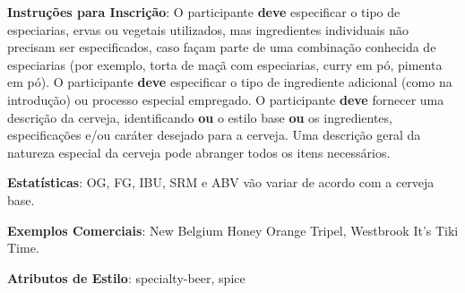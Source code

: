 \textbf{Instruções para Inscrição}: O participante \textbf{deve} especificar o tipo de especiarias, ervas ou vegetais utilizados, mas ingredientes individuais não precisam ser especificados, caso façam parte de uma combinação conhecida de especiarias (por exemplo, torta de maçã com especiarias, curry em pó, pimenta em pó). O participante \textbf{deve} especificar o tipo de ingrediente adicional (como na introdução) ou processo especial empregado. O participante \textbf{deve} fornecer uma descrição da cerveja, identificando \textbf{ou} o estilo base \textbf{ou} os ingredientes, especificações e/ou caráter desejado para a cerveja. Uma descrição geral da natureza especial da cerveja pode abranger todos os itens necessários.

\textbf{Estatísticas}: OG, FG, IBU, SRM e ABV vão variar de acordo com a cerveja base.

\textbf{Exemplos Comerciais}: New Belgium Honey Orange Tripel, Westbrook It's Tiki Time.

\textbf{Atributos de Estilo}: specialty-beer, spice

